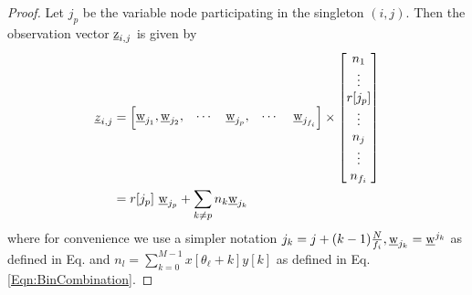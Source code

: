 \begin{proof}
	
	Let $j_p$ be the variable node participating in the singleton $(i,j)$. Then the observation vector $\underline{\mathrm{z}}_{i,j}$ is given by
	\begin{align*}
	\underline{z}_{i,j} &= \begin{bmatrix}
	\wv_{j_{1}},\wv_{j_2}, & \cdots   & \wv_{j_p}, &\cdots \ &\wv_{j_{f_i}}
	\end{bmatrix} \times
	\begin{bmatrix}
	n_{1} \\
	\vdots \\
	r[j_p]\\
	\vdots\\
	n_{j} \\
	\vdots\\
	n_{f_i}\\
	\end{bmatrix}\\
	&= r[j_p] ~ \wv_{j_p}+ \sum_{k \neq p}n_k \wv_{j_k} \\
	\end{align*}
	where for convenience we use a simpler notation $j_k=j+(k-1)\frac{N}{f_i}, \underline{\mathrm{w}}_{j_k}=\underline{\mathrm{w}}^{j_k}$ as defined in Eq. and $n_{l}=\sum\limits_{k=0}^{M-1}x[\theta_{\ell}+k]y[k]$ as defined in Eq. \eqref{Eqn:BinCombination}.
	

\end{proof}
